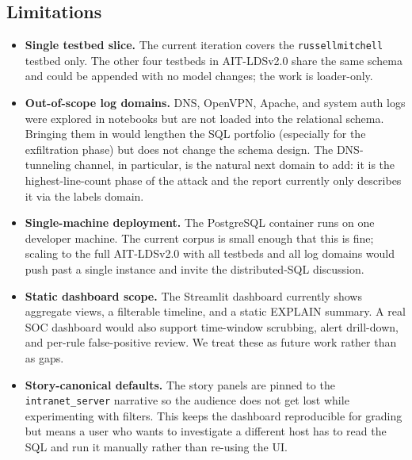 \subsection{Limitations}
\begin{itemize}
  \item \textbf{Single testbed slice.} The current iteration covers
    the \texttt{russellmitchell} testbed only. The other four
    testbeds in AIT-LDSv2.0 share the same schema and could be
    appended with no model changes; the work is loader-only.
  \item \textbf{Out-of-scope log domains.} DNS, OpenVPN, Apache, and
    system auth logs were explored in notebooks but are not loaded
    into the relational schema. Bringing them in would lengthen the
    SQL portfolio (especially for the exfiltration phase) but does
    not change the schema design. The DNS-tunneling channel, in
    particular, is the natural next domain to add: it is the
    highest-line-count phase of the attack and the report currently
    only describes it via the labels domain.
  \item \textbf{Single-machine deployment.} The PostgreSQL container
    runs on one developer machine. The current corpus is small enough
    that this is fine; scaling to the full AIT-LDSv2.0 with all
    testbeds and all log domains would push past a single instance
    and invite the distributed-SQL discussion.
  \item \textbf{Static dashboard scope.} The Streamlit dashboard
    currently shows aggregate views, a filterable timeline, and a
    static EXPLAIN summary. A real SOC dashboard would also support
    time-window scrubbing, alert drill-down, and per-rule
    false-positive review. We treat these as future work rather than
    as gaps.
  \item \textbf{Story-canonical defaults.} The story panels are
    pinned to the \texttt{intranet\_server} narrative so the
    audience does not get lost while experimenting with filters.
    This keeps the dashboard reproducible for grading but means a
    user who wants to investigate a different host has to read the
    SQL and run it manually rather than re-using the UI.
\end{itemize}

